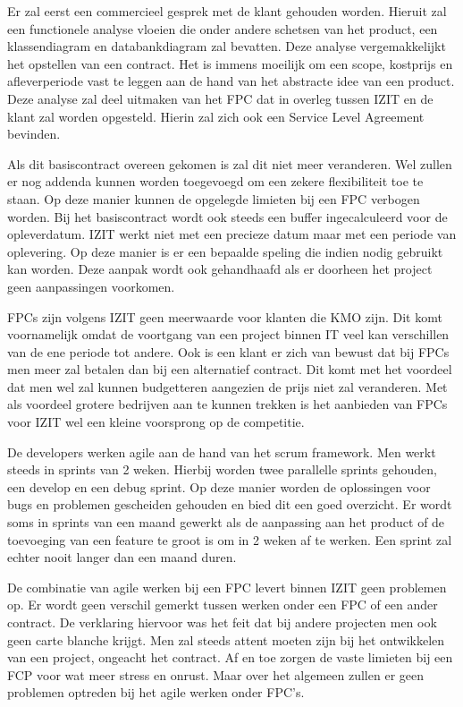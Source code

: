 \documentclass{hogent-article}
\begin{document}
    Er zal eerst een commercieel gesprek met de klant gehouden worden. Hieruit zal een functionele analyse vloeien die onder andere schetsen van het product, een klassendiagram en databankdiagram zal bevatten. Deze analyse vergemakkelijkt het opstellen van een contract. Het is immens moeilijk om een scope, kostprijs en afleverperiode vast te leggen aan de hand van het abstracte idee van een product. Deze analyse zal deel uitmaken van het FPC dat in overleg tussen IZIT en de klant zal worden opgesteld. Hierin zal zich ook een Service Level Agreement bevinden.
    
    Als dit basiscontract overeen gekomen is zal dit niet meer veranderen. Wel zullen er nog addenda kunnen worden toegevoegd om een zekere flexibiliteit toe te staan. Op deze manier kunnen de opgelegde limieten bij een FPC verbogen worden. Bij het basiscontract wordt ook steeds een buffer ingecalculeerd voor de opleverdatum. IZIT werkt niet met een precieze datum maar met een periode van oplevering. Op deze manier is er een bepaalde speling die indien nodig gebruikt kan worden. Deze aanpak wordt ook gehandhaafd als er doorheen het project geen aanpassingen voorkomen.
    
    FPCs zijn volgens IZIT geen meerwaarde voor klanten die KMO zijn. Dit komt voornamelijk omdat de voortgang van een project binnen IT veel kan verschillen van de ene periode tot andere. Ook is een klant er zich van bewust dat bij FPCs men meer zal betalen dan bij een alternatief contract. Dit komt met het voordeel dat men wel zal kunnen budgetteren aangezien de prijs niet zal veranderen. Met als voordeel grotere bedrijven aan te kunnen trekken is het aanbieden van FPCs voor IZIT wel een kleine voorsprong op de competitie.
    
    De developers werken agile aan de hand van het scrum framework. Men werkt steeds in sprints van 2 weken. Hierbij worden twee parallelle sprints gehouden, een develop en een debug sprint. Op deze manier worden de oplossingen voor bugs en problemen gescheiden gehouden en bied dit een goed overzicht. Er wordt soms in sprints van een maand gewerkt als de aanpassing aan het product of de toevoeging van een feature te groot is om in 2 weken af te werken. Een sprint zal echter nooit langer dan een maand duren. 
    
     De combinatie van agile werken bij een FPC levert binnen IZIT geen problemen op. Er wordt geen verschil gemerkt tussen werken onder een FPC of een ander contract. De verklaring hiervoor was het feit dat bij andere projecten men ook geen carte blanche krijgt. Men zal steeds attent moeten zijn bij het ontwikkelen van een project, ongeacht het contract. Af en toe zorgen de vaste limieten bij een FCP  voor wat meer stress en onrust. Maar over het algemeen zullen er geen problemen optreden bij het agile werken onder FPC's.
    
\end{document}
